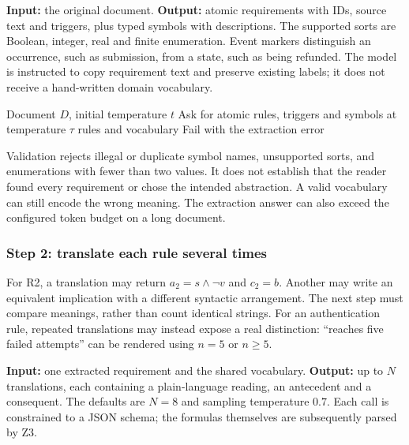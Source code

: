 \textbf{Input:} the original document.
\textbf{Output:} atomic requirements with IDs, source text and triggers,
plus typed symbols with descriptions. The supported sorts are Boolean,
integer, real and finite enumeration. Event markers distinguish an
occurrence, such as submission, from a state, such as being refunded.
The model is instructed to copy requirement text and preserve existing
labels; it does not receive a hand-written domain vocabulary.

\begin{algorithm}[H]
\caption{Read a document into rules and symbols}\label{alg:read}
\begin{algorithmic}[1]
\Require Document $D$, initial temperature $t$
  \State Ask for atomic rules, triggers and symbols at temperature $\tau$
    \State \Return rules and vocabulary
  \EndIf
\EndFor
\State Fail with the extraction error
\end{algorithmic}
\end{algorithm}

Validation rejects illegal or duplicate symbol names, unsupported sorts,
and enumerations with fewer than two values. It does not establish that
the reader found every requirement or chose the intended abstraction.
A valid vocabulary can still encode the wrong meaning. The extraction
answer can also exceed the configured
token budget on a long document.

\subsubsection{Step 2: translate each rule several times}
For R2, a translation may return $a_2=s\land\neg v$ and $c_2=b$.
Another may write an equivalent implication with a different syntactic
arrangement. The next step must compare meanings, rather than count
identical strings. For an authentication rule, repeated translations may
instead expose a real distinction: ``reaches five failed attempts'' can
be rendered using $n=5$ or $n\ge5$.

\textbf{Input:} one extracted requirement and the shared vocabulary.
\textbf{Output:} up to $N$ translations, each containing a plain-language
reading, an antecedent and a consequent. The defaults are $N=8$ and
sampling temperature $0.7$. Each call is constrained to a JSON schema;
the formulas themselves are subsequently parsed by Z3.

